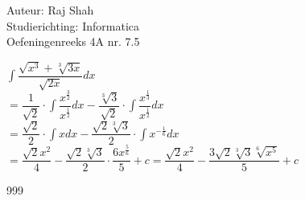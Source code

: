 \documentclass[a4paper]{article}
\begin{document}
  
\noindent \large Auteur: Raj Shah \\
\noindent \large Studierichting: Informatica\\
\noindent \large Oefeningenreeks 4A nr. 7.5 \\

\medskip

\normalsize

$\displaystyle\int \dfrac{\sqrt{x^3} + \sqrt[3]{3x}}{\sqrt {2x}} dx$\\

$ = \dfrac{1}{\sqrt {2}} \cdot \displaystyle\int \dfrac{x^{\tfrac{3}{2}}}{x^{\tfrac{1}{2}}}dx - \dfrac{\sqrt[3] 3}{\sqrt 2} \cdot \displaystyle\int \dfrac{x^{\tfrac{1}{3}}}{x^{\tfrac{1}{2}}}dx $\\

$ = \dfrac{\sqrt {2}}{2} \cdot \displaystyle\int x dx - \dfrac{\sqrt{2}\sqrt[3]{3}}{2} \cdot \displaystyle\int x^{-\tfrac{1}{6}} dx$\\

$ = \dfrac{\sqrt{2}x^2}{4} - \dfrac{\sqrt{2}\sqrt[3]{3}}{2} \cdot \dfrac{6x^{\tfrac{5}{6}}}{5} + c = \dfrac{\sqrt{2}x^2}{4} - \dfrac{3\sqrt{2} \sqrt[3]{3} \sqrt[6]{x^5}}{5} + c$


\begin{thebibliography}{999}
\end{thebibliography}
\end{document}
